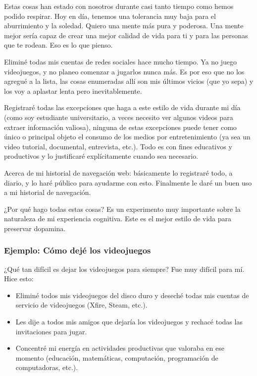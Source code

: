 \documentclass[12pt]{article}
\begin{document}
	Estas cosas han estado con nosotros durante casi tanto tiempo como hemos
	podido respirar. Hoy en día, tenemos una tolerancia muy baja para el
	aburrimiento y la soledad. Quiero una mente más pura y poderosa. Una
	mente mejor sería capaz de crear una mejor calidad de vida para ti y
	para las personas que te rodean. Eso es lo que pienso.

	Eliminé todas mis cuentas de redes sociales hace mucho tiempo. Ya no
	juego videojuegos, y no planeo comenzar a jugarlos nunca más. Es por
	eso que no los agregué a la lista, las cosas enumeradas allí son mis
	últimos vicios (que yo sepa) y los voy a aplastar lenta pero
	inevitablemente.

	Registraré todas las excepciones que haga a este estilo de vida durante
	mi día (como soy estudiante universitario, a veces necesito ver algunos
	videos para extraer información valiosa), ninguna de estas excepciones
	puede tener como único o principal objeto el consumo de los medios por
	entretenimiento (ya sea un video tutorial, documental, entrevista, etc.).
	Todo es con fines educativos y productivos y lo justificaré
	explícitamente cuando sea necesario.

	Acerca de mi historial de navegación web: básicamente lo registraré
	todo, a diario, y lo haré público para ayudarme con esto. Finalmente le
	daré un buen uso a mi historial de navegación.

	¿Por qué hago todas estas cosas? Es un experimento muy importante sobre
	la naturaleza de mi experiencia cognitiva. Este es el mejor estilo de
	vida para preservar dopamina.

	\subsubsection*{Ejemplo: Cómo dejé los videojuegos}

	¿Qué tan difícil es dejar los videojuegos para siempre? Fue muy difícil
	para mí. Hice esto:

	\begin{itemize}
	\item Eliminé todos mis videojuegos del disco duro y deseché todas mis
	cuentas de servicio de videojuegos (Xfire, Steam, etc.).
	\item Les dije a todos mis amigos que dejaría los videojuegos y rechacé
	todas las invitaciones para jugar.
	\item Concentré mi energía en actividades productivas que valoraba en
	ese momento (educación, matemáticas, computación, programación de
	computadoras, etc.).
	\end{itemize}
\end{document}
